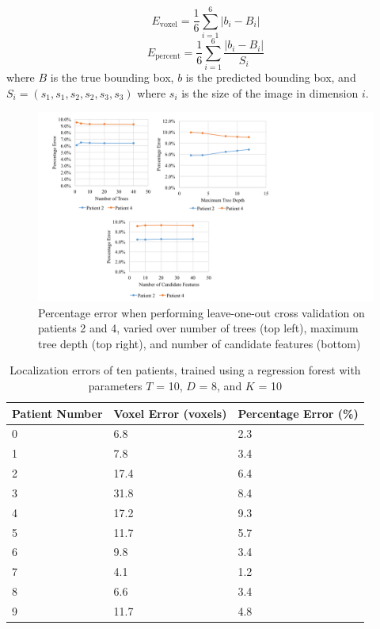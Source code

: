 \begin{equation}
  E_{\text{voxel}} = \frac{1}{6} \sum_{i=1} ^ {6} |b_i - B_i|
\end{equation}
\begin{equation}
  E_{\text{percent}} = \frac{1}{6} \sum_{i=1} ^ {6} \frac{|b_i - B_i|}{S_{i}}
\end{equation}
where $B$ is the true bounding box, $b$ is the predicted bounding box, and $S_i = (s_1, s_1, s_2, s_2, s_3, s_3)$ where $s_i$ is the size of the image in dimension $i$.
\begin{figure}
\includegraphics[scale=0.7]{parameters.png}
\caption{Percentage error when performing leave-one-out cross validation on patients 2 and 4, varied over number of trees (top left), maximum tree depth (top right), and number of candidate features (bottom)}
\end{figure}

\begin{table}
  \caption{Localization errors of ten patients, trained using a regression forest with parameters $T$ = 10, $D$ = 8, and $K$ = 10}
  \label{tab:err}
  \begin{tabular}{p{2cm}p{2cm}p{2cm}}
    \toprule
    Patient Number & Voxel Error (voxels) & Percentage Error (\%) \\
    \midrule
    0 & 6.8 & 2.3\\
    1 & 7.8 & 3.4\\
    2 & 17.4 & 6.4\\
    3 & 31.8 & 8.4\\
    4 & 17.2 & 9.3\\
    5 & 11.7 & 5.7\\
    6 & 9.8 & 3.4\\
    7 & 4.1 & 1.2\\
    8 & 6.6 & 3.4\\
    9 & 11.7 & 4.8\\
    \bottomrule
  \end{tabular}
\end{table}

